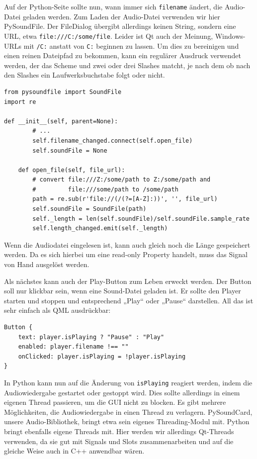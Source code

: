 \documentclass[a4paper]{article}
\begin{document}
Auf der Python-Seite sollte nun, wann immer sich \verb~filename~ ändert, die Audio-Datei geladen werden. Zum Laden der Audio-Datei verwenden wir hier PySoundFile. Der FileDialog übergibt allerdings keinen String, sondern eine URL, etwa \verb~file:///C:/some/file~. Leider ist Qt auch der Meinung, Windows-URLs mit \verb~/C:~ anstatt von \verb~C:~ beginnen zu lassen. Um dies zu bereinigen und einen reinen Dateipfad zu bekommen, kann ein regulärer Ausdruck verwendet werden, der das Scheme und zwei oder drei Slashes matcht, je nach dem ob nach den Slashes ein Laufwerksbuchstabe folgt oder nicht.

\begin{verbatim}
from pysoundfile import SoundFile
import re

def __init__(self, parent=None):
        # ...
        self.filename_changed.connect(self.open_file)
        self.soundFile = None

    def open_file(self, file_url):
        # convert file:///Z:/some/path to Z:/some/path and
        #         file:///some/path to /some/path
        path = re.sub(r'file://(/(?=[A-Z]:))', '', file_url)
        self.soundFile = SoundFile(path)
        self._length = len(self.soundFile)/self.soundFile.sample_rate
        self.length_changed.emit(self._length)
\end{verbatim}

Wenn die Audiodatei eingelesen ist, kann auch gleich noch die Länge gespeichert werden. Da es sich hierbei um eine read-only Property handelt, muss das Signal von Hand ausgelöst werden.

Als nächstes kann auch der Play-Button zum Leben erweckt werden. Der Button soll nur klickbar sein, wenn eine Sound-Datei geladen ist. Er sollte den Player starten und stoppen und entsprechend „Play“ oder „Pause“ darstellen. All das ist sehr einfach als QML ausdrückbar:

\begin{verbatim}
Button {
    text: player.isPlaying ? "Pause" : "Play"
    enabled: player.filename !== ""
    onClicked: player.isPlaying = !player.isPlaying
}
\end{verbatim}

In Python kann nun auf die Änderung von \verb~isPlaying~ reagiert werden, indem die Audiowiedergabe gestartet oder gestoppt wird. Dies sollte allerdings in einem eigenen Thread passieren, um die GUI nicht zu blocken. Es gibt mehrere Möglichkeiten, die Audiowiedergabe in einen Thread zu verlagern. PySoundCard, unsere Audio-Bibliothek, bringt etwa sein eigenes Threading-Modul mit. Python bringt ebenfalls eigene Threads mit. Hier werden wir allerdings Qt-Threads verwenden, da sie gut mit Signals und Slots zusammenarbeiten und auf die gleiche Weise auch in C++ anwendbar wären.
\end{document}
